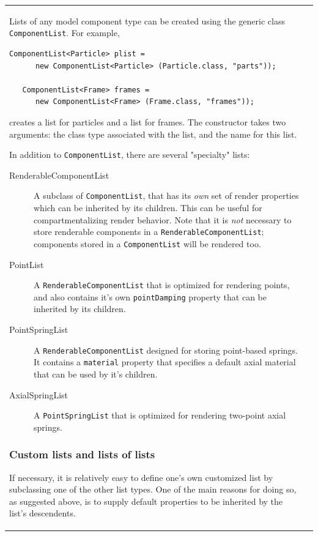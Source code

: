 \documentclass{article}
\begin{document}
\begin{tabular}{ll}
Lists of any model component type can be created using the
generic class {\tt ComponentList}. For example,
\begin{lstlisting}[]
   ComponentList<Particle> plist = 
      new ComponentList<Particle> (Particle.class, "parts"));

   ComponentList<Frame> frames = 
      new ComponentList<Frame> (Frame.class, "frames"));
\end{lstlisting}
creates a list for particles and a list for frames. The constructor
takes two arguments: the class type associated with the list, and
the name for this list.

In addition to {\tt ComponentList}, there are several "specialty"
lists:

\begin{description}

\item[RenderableComponentList] A subclass of {\tt ComponentList}, that
has its {\it own} set of render properties which can be inherited by
its children. This can be useful for compartmentalizing render
behavior.  Note that it is {\it not} necessary to store renderable
components in a {\tt RenderableComponentList}; components stored in a
{\tt ComponentList} will be rendered too.

\item[PointList] A {\tt RenderableComponentList} that is optimized for
rendering points, and also contains it's own {\tt pointDamping}
property that can be inherited by its children.

\item[PointSpringList] A {\tt RenderableComponentList} designed for
storing point-based springs. It contains a {\tt material} property that
specifies a default axial material that can be used by it's children.

\item[AxialSpringList] A {\tt PointSpringList} that is optimized for
rendering two-point axial springs.

\end{description}

\subsubsection*{Custom lists and lists of lists}

If necessary, it is relatively easy to define one's own customized
list by subclassing one of the other list types. One of the main
reasons for doing so, as suggested above, is to supply default
properties to be inherited by the list's descendents.


\end{tabular}
\end{document}
